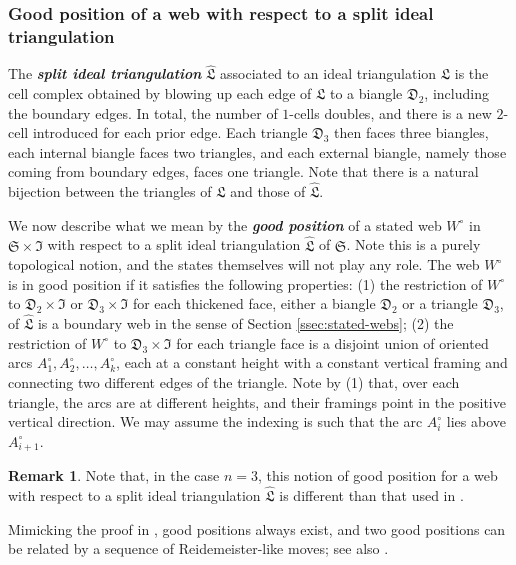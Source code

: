\documentclass[12pt,
	]{amsart}
\theoremstyle{definition}
\newtheorem{remark}[theorem]{Remark}
\renewcommand{\hat}{\widehat}
\newcommand{\mfrak}[1]{\mathfrak{#1}}
\newcommand{\define}[1]{{\textit{\textbf{#1}}}}
\newcommand{\unbased}[1]{#1^\circ}
\newcommand{\surf}{\mfrak{S}}
\newcommand{\intt}{\mfrak{I}}
\newcommand{\biang}{\mfrak{D}_2}
\newcommand{\ttriang}{\mfrak{D}_3}
\newcommand{\idealtriang}{\mfrak{L}}
\newcommand{\splitidealtriang}{\hat{\idealtriang}}
\begin{document}
\subsubsection{Good position of a web with respect to a split ideal triangulation}\label{split-ideal-triangulations-good-position-and-definition-of-the-quantum-trace-map}

The \define{split ideal triangulation} $\splitidealtriang$ associated to an ideal triangulation $\idealtriang$ is the cell complex obtained by blowing up each edge of $\idealtriang$ to a biangle $\biang$, including the boundary edges.  In total, the number of $1$-cells doubles, and there is a new $2$-cell introduced for each prior edge.  Each triangle $\ttriang$ then faces three biangles, each internal biangle faces two triangles, and each external biangle, namely those coming from boundary edges, faces one triangle.  Note that there is a natural bijection between the triangles of $\idealtriang$ and those of $\splitidealtriang$.  

We now describe what we mean by the \define{good position} of a stated web $\unbased{W}$ in $\surf\times\intt$ with respect to a split ideal triangulation $\splitidealtriang$ of $\surf$.  Note this is a purely topological notion, and the states themselves will not play any role.  The web $\unbased{W}$ is in good position if it satisfies the following properties:  (1)  the restriction of $\unbased{W}$ to $\biang\times\intt$ or $\ttriang\times\intt$ for each thickened face, either a biangle $\biang$ or a triangle $\ttriang$, of $\splitidealtriang$ is a boundary web in the sense of Section \ref{ssec:stated-webs};  (2)  the restriction of $\unbased{W}$ to $\ttriang\times\intt$ for each triangle face is a disjoint union of oriented arcs $\unbased{A}_1, \unbased{A}_2, \dots, \unbased{A}_k$, each at a constant height with a constant vertical framing and connecting two different edges of the triangle.  Note by (1) that, over each triangle, the arcs are at different heights, and their framings point in the positive vertical direction.  We may assume the indexing is such that the arc $\unbased{A}_i$ lies above $\unbased{A}_{i+1}$.  

\begin{remark}
Note that, in the case $n=3$, this notion of good position for a web with respect to a split ideal triangulation $\splitidealtriang$ is different than that used in \cite{douglasMR4685684, douglas2022tropical}.  
\end{remark}

Mimicking the proof in \cite{bonahonMR2851072}, good positions always exist, and two good positions can be related by a sequence of Reidemeister-like moves; see also \cite{douglasMR4717274, kim2022rm}. 
\end{document}
